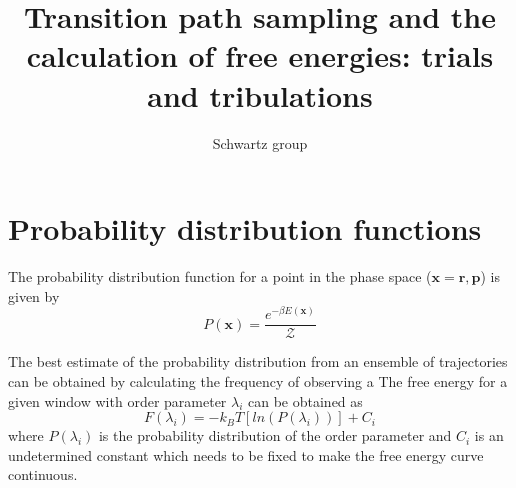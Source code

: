 \documentclass{article}
\title{Transition path sampling and the calculation of free energies: trials and tribulations}
\author{Schwartz group}
\begin{document}
\maketitle
\section*{Probability distribution functions}

The probability distribution function for a point in the phase space ($\mathbf{x} = {\mathbf{r,p}}$) is given by 
\begin{equation}
P(\mathbf{x}) = \frac{e^{-\beta E(\mathbf{x})}}{\mathcal{Z}}
\end{equation}

The best estimate of the probability distribution from an ensemble of trajectories can be 
obtained by calculating the frequency of observing a 
The free energy for a given window with order parameter $\lambda_i$ can be obtained as 
\begin{equation}
F(\lambda_i) = -k_{B}T[ln(P(\lambda_i))] + C_i
\end{equation}
where $P(\lambda_i)$ is the probability distribution of the order parameter and $C_i$ is an 
undetermined constant which needs to be fixed to make the free energy curve continuous.  
\end{document}
